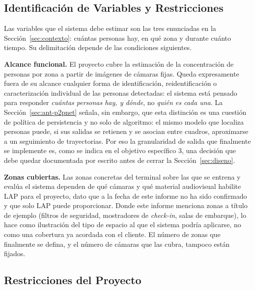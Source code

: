 \subsection{Identificación de Variables y Restricciones}
\label{sec:alcance}

Las variables que el sistema debe estimar son las tres enunciadas en la
Sección~\ref{sec:contexto}: cuántas personas hay, en qué zona y durante
cuánto tiempo. Su delimitación depende de las condiciones siguientes.

\textbf{Alcance funcional.} El proyecto cubre la estimación de la
concentración de personas por zona a partir de imágenes de cámaras fijas.
Queda expresamente fuera de su alcance cualquier forma de identificación,
reidentificación o caracterización individual de las personas detectadas:
el sistema está pensado para responder \emph{cuántas personas hay, y
dónde}, no \emph{quién es cada una}. La Sección~\ref{sec:ant-p2pnet}
señala, sin embargo, que esta distinción es una cuestión de política de
persistencia y no solo de algoritmo: el mismo modelo que localiza personas
puede, si sus salidas se retienen y se asocian entre cuadros, aproximarse
a un seguimiento de trayectorias. Por eso la granularidad de salida que
finalmente se implemente es, como se indica en el objetivo específico 3,
una decisión que debe quedar documentada por escrito antes de cerrar la
Sección~\ref{sec:diseno}.

\textbf{Zonas cubiertas.} Las zonas concretas del terminal sobre las que
se entrena y evalúa el sistema dependen de qué cámaras y qué material
audiovisual habilite LAP para el proyecto, dato que a la fecha de este
informe no ha sido confirmado y que solo LAP puede proporcionar. Donde este informe menciona zonas a título de ejemplo
(filtros de seguridad, mostradores de \emph{check-in}, salas de embarque),
lo hace como ilustración del tipo de espacio al que el sistema podría
aplicarse, no como una cobertura ya acordada con el cliente. El número de
zonas que finalmente se defina, y el número de cámaras que las
cubra, tampoco están fijados.

\subsection{Restricciones del Proyecto}
\label{sec:restricciones}


